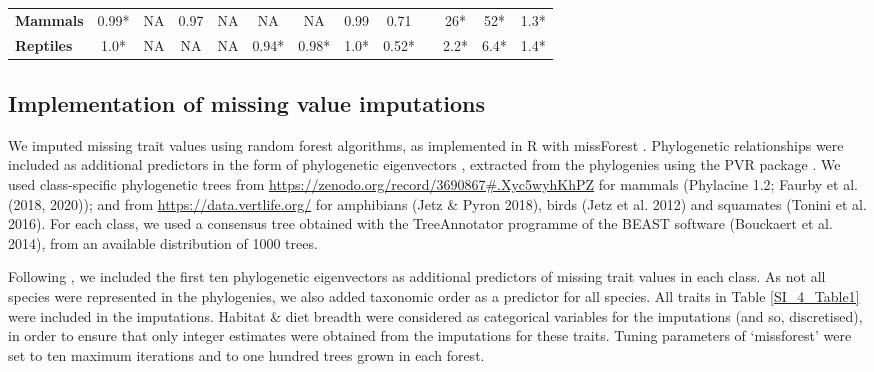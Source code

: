 \documentclass[11pt]{article}
\begin{document}
\begin{table}[h!]
\begin{center}
\begin{tabular}{l|c|c|c|c|c|c|c|c|c|c|c|c|}
\multicolumn{1}{|l|}{\textbf{Mammals}}    & 0.99*       & NA          & 0.97        & NA          & NA          & NA         & 0.99         & 0.71    &    & 26*         & 52*      & 1.3*        \\ %
\multicolumn{1}{|l|}{\textbf{Reptiles}}   & 1.0*        & NA          & NA          & NA          & 0.94*       & 0.98*      & 1.0*         & 0.52*    &   & 2.2*        & 6.4*     & 1.4*        \\ \hline
\end{tabular}
\end{center}
\end{table}

\subsection{Implementation of missing value imputations}
We imputed missing trait values using random forest algorithms, as implemented in R with missForest \citep{Stekhoven2012, Stekhoven2016}. Phylogenetic relationships were included as additional predictors in the form of phylogenetic eigenvectors \citep{DinizFilho2012}, extracted from the phylogenies using the PVR package \citep{Santos2018}. We used class-specific phylogenetic trees from \url{https://zenodo.org/record/3690867#.Xyc5wyhKhPZ} for mammals (Phylacine 1.2; Faurby et al. (2018, 2020)); and from \url{https://data.vertlife.org/} for amphibians (Jetz \& Pyron 2018), birds (Jetz et al. 2012) and squamates (Tonini et al. 2016). For each class, we used a consensus tree obtained with the TreeAnnotator programme of the BEAST software (Bouckaert et al. 2014), from an available distribution of 1000 trees. 

Following \citet{Penone2014}, we included the first ten phylogenetic eigenvectors as additional predictors of missing trait values in each class. As not all species were represented in the phylogenies, we also added taxonomic order as a predictor for all species. All traits in Table \ref{SI_4_Table1} were included in the imputations. Habitat \& diet breadth were considered as categorical variables for the imputations (and so, discretised), in order to ensure that only integer estimates were obtained from the imputations for these traits. Tuning parameters of `missforest' were set to ten maximum iterations and to one hundred trees grown in each forest.
\end{document}
